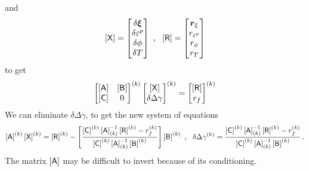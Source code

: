 and
\[
  \MX = \begin{bmatrix}
    \delta\Bxi \\ \delta\Ve^p \\ \delta\phi \\ \delta T 
    \end{bmatrix} ~,~~
  \MR = \begin{bmatrix}
    \Br_\xi \\ r_{\Ve^p} \\ r_\phi \\ r_T 
  \end{bmatrix}
\]
to get
\[
  \begin{bmatrix}
    \MA & \MB \\ \MC & 0 
  \end{bmatrix}^{(k)}
  \begin{bmatrix}
    \MX \\ \delta\Delta\gamma
  \end{bmatrix}^{(k)} = 
  \begin{bmatrix}
    \MR \\ r_f
  \end{bmatrix}^{(k)}
\]
We can eliminate $\delta\Delta\gamma$, to get the new system of equations
\[
  \MA^{(k)} \MX^{(k)} = \MR^{(k)} - \left[\frac{\MC^{(k)} \MA^{-1}_{(k)} \MR^{(k)} - r_f^{(k)}}{\MC^{(k)} \MA^{-1}_{(k)} \MB^{(k)}}\right] \MB^{(k)}
  ~,~~
  \delta\Delta\gamma^{(k)} = \frac{\MC^{(k)} \MA^{-1}_{(k)} \MR^{(k)} - r_f^{(k)}}{\MC^{(k)} \MA^{-1}_{(k)} \MB^{(k)}} \,.
\]
The matrix $\MA$ may be difficult to invert because of its conditioning.  

